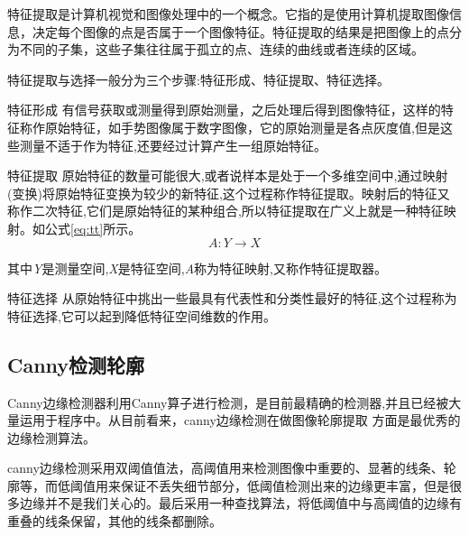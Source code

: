 \documentclass{XDBAthesis}
\begin{document}
    特征提取是计算机视觉和图像处理中的一个概念。它指的是使用计算机提取图像信息，决定每个图像的点是否属于一个图像特征。特征提取的结果是把图像上的点分为不同的子集，这些子集往往属于孤立的点、连续的曲线或者连续的区域。

特征提取与选择一般分为三个步骤:特征形成、特征提取、特征选择。

特征形成  有信号获取或测量得到原始测量，之后处理后得到图像特征，这样的特征称作原始特征，如手势图像属于数字图像，它的原始测量是各点灰度值,但是这些测量不适于作为特征,还要经过计算产生一组原始特征。

     特征提取  原始特征的数量可能很大,或者说样本是处于一个多维空间中,通过映射(变换)将原始特征变换为较少的新特征,这个过程称作特征提取。映射后的特征又称作二次特征,它们是原始特征的某种组合,所以特征提取在广义上就是一种特征映射。如公式\eqref{eq:tt}所示。
\begin{equation}
    A:Y\rightarrow X
    \label{eq:tt}
\end{equation}

其中\emph{Y}是测量空间,\emph{X}是特征空间,\emph{A}称为特征映射,又称作特征提取器。

     特征选择  从原始特征中挑出一些最具有代表性和分类性最好的特征,这个过程称为特征选择,它可以起到降低特征空间维数的作用。

\subsection{Canny检测轮廓}

Canny边缘检测器利用Canny算子进行检测，是目前最精确的检测器,并且已经被大量运用于程序中。从目前看来，canny边缘检测在做图像轮廓提取 方面是最优秀的边缘检测算法。

canny边缘检测采用双阈值值法，高阈值用来检测图像中重要的、显著的线条、轮廓等，而低阈值用来保证不丢失细节部分，低阈值检测出来的边缘更丰富，但是很多边缘并不是我们关心的。最后采用一种查找算法，将低阈值中与高阈值的边缘有重叠的线条保留，其他的线条都删除。
\end{document}
